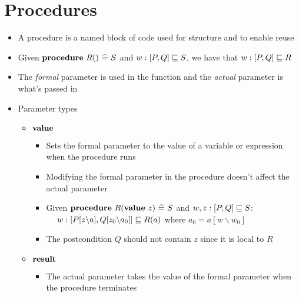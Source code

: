 \section{Procedures}

\begin{itemize}
	
	\item A procedure is a named block of code used for structure and to enable reuse
	
	\item Given $ {\bf procedure} ~ R() ~ \widehat{=} ~ S $ and $ w : [P, Q] \mathrel{\sqsubseteq} S $, we have that $ w : [P, Q] \mathrel{\sqsubseteq} R $
	
	\item The \textit{formal} parameter is used in the function and the \textit{actual} parameter is what's passed in
	
	\item Parameter types
	
	\begin{itemize}
		
		\item $ {\bf value} $
		
		\begin{itemize}
			
			\item Sets the formal parameter to the value of a variable or expression when the procedure runs
			
			\item Modifying the formal parameter in the procedure doesn't affect the actual parameter
			
			\item Given $ {\bf procedure} ~ R({\bf value} ~ z) ~ \widehat{=} ~ S $  and $ w, z : [P, Q] \mathrel{\sqsubseteq} S$:\\
			$ ~~~~ w : [P[z \backslash a], Q[z_0 \backslash a_0]] \mathrel{\sqsubseteq} R(a) $ where $ a_0 = a[w \backslash w_0] $
			
			\item The postcondition $ Q $ should not contain $ z $ since it is local to $ R $
				
		\end{itemize}
		
		\item $ {\bf result} $
		
		\begin{itemize}
			
			\item The actual parameter takes the value of the formal parameter when the procedure terminates
			

\end{itemize}
\end{itemize}
\end{itemize}
